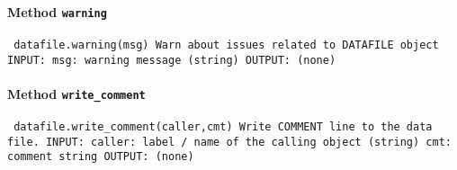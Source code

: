 \paragraph{Method \texttt{warning}}
\vspace{1ex}
\texttt{\newline
datafile.warning(msg)\newline
\newline
Warn about issues related to DATAFILE object\newline
\newline
INPUT:\newline
msg: warning message (string)\newline
\newline
OUTPUT:\newline
(none)\newline
\newline
}

\paragraph{Method \texttt{write_comment}}
\vspace{1ex}
\texttt{\newline
datafile.write_comment(caller,cmt)\newline
\newline
Write COMMENT line to the data file.\newline
\newline
INPUT:\newline
caller: label / name of the calling object (string)\newline
cmt: comment string\newline
\newline
OUTPUT:\newline
(none)\newline
\newline
}

